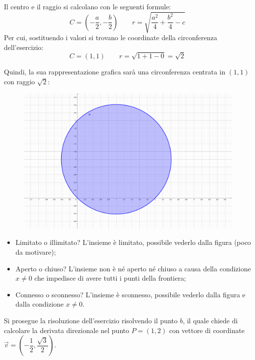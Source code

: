 \documentclass[a4paper]{article}
\begin{document}
	Il centro e il raggio si calcolano con le seguenti formule:
	\begin{equation*}
		C = \left(-\dfrac{a}{2}, -\dfrac{b}{2}\right)
		\hspace{2em}
		r = \sqrt{\dfrac{a^{2}}{4} + \dfrac{b^{2}}{4} - c}
	\end{equation*}
	Per cui, sostituendo i valori si trovano le coordinate della circonferenza dell'esercizio:
	\begin{equation*}
		C = \left(1, 1\right)
		\hspace{2em}
		r = \sqrt{1 + 1 - 0} = \sqrt{2}
	\end{equation*}\newpage

	\noindent
	Quindi, la sua rappresentazione grafica sarà una circonferenza centrata in $\left(1,1\right)$ con raggio $\sqrt{2}$:
	\begin{figure}[!htp]
		\centering
		\includegraphics[width=\textwidth]{img/grafico-ex3-esame1.pdf}
	\end{figure}
	\begin{itemize}
		\item Limitato o illimitato? L'insieme è limitato, possibile vederlo dalla figura (poco da motivare);
		
		\item Aperto o chiuso? L'insieme non è né aperto né chiuso a causa della condizione $x \ne 0$ che impedisce di avere tutti i punti della frontiera;
		
		\item Connesso o sconnesso? L'insieme è sconnesso, possibile vederlo dalla figura e dalla condizione $x \ne 0$.
	\end{itemize}
	Si prosegue la risoluzione dell'esercizio risolvendo il punto $b$, il quale chiede di calcolare la derivata direzionale nel punto $P = \left(1,2\right)$ con vettore di coordinate $\overrightarrow{v} = \left(-\dfrac{1}{2}, \dfrac{\sqrt{3}}{2}\right)$.\newpage
	
\end{document}
